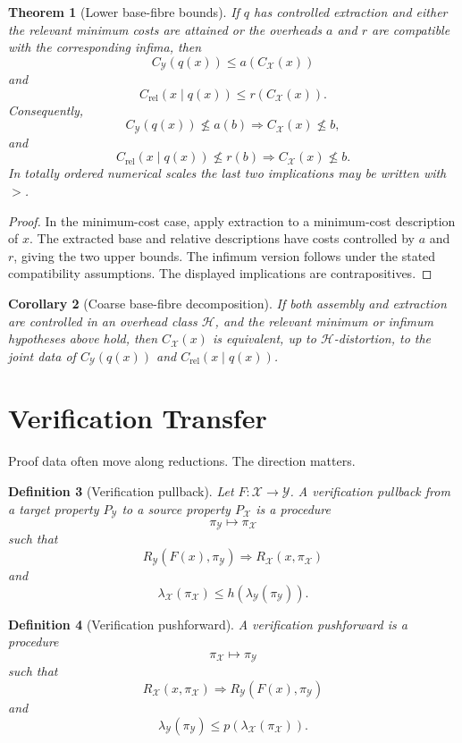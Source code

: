 \documentclass[11pt]{article}
\newtheorem{theorem}{Theorem}[section]
\newtheorem{corollary}[theorem]{Corollary}
\newtheorem{definition}[theorem]{Definition}
\begin{document}
\begin{theorem}[Lower base-fibre bounds]
If \(q\) has controlled extraction and either the relevant minimum costs are attained or the overheads \(a\) and \(r\) are compatible with the corresponding infima, then
\[
C_\mathcal Y(q(x))\leq a(C_\mathcal X(x))
\]
and
\[
C_{\mathrm{rel}}(x\mid q(x))\leq r(C_\mathcal X(x)).
\]
Consequently,
\[
C_\mathcal Y(q(x))\nleq a(b)\Longrightarrow C_\mathcal X(x)\nleq b,
\]
and
\[
C_{\mathrm{rel}}(x\mid q(x))\nleq r(b)\Longrightarrow C_\mathcal X(x)\nleq b.
\]
In totally ordered numerical scales the last two implications may be written with \(>\).
\end{theorem}

\begin{proof}
In the minimum-cost case, apply extraction to a minimum-cost description of \(x\). The extracted base and relative descriptions have costs controlled by \(a\) and \(r\), giving the two upper bounds. The infimum version follows under the stated compatibility assumptions. The displayed implications are contrapositives.
\end{proof}

\begin{corollary}[Coarse base-fibre decomposition]
If both assembly and extraction are controlled in an overhead class \(\mathcal H\), and the relevant minimum or infimum hypotheses above hold, then \(C_\mathcal X(x)\) is equivalent, up to \(\mathcal H\)-distortion, to the joint data of \(C_\mathcal Y(q(x))\) and \(C_{\mathrm{rel}}(x\mid q(x))\).
\end{corollary}

\section{Verification Transfer}

Proof data often move along reductions. The direction matters.

\begin{definition}[Verification pullback]
Let \(F:\mathcal X\to\mathcal Y\). A verification pullback from a target property \(P_\mathcal Y\) to a source property \(P_\mathcal X\) is a procedure
\[
\pi_\mathcal Y\mapsto \pi_\mathcal X
\]
such that
\[
R_\mathcal Y(F(x),\pi_\mathcal Y)
\Longrightarrow
R_\mathcal X(x,\pi_\mathcal X)
\]
and
\[
\lambda_\mathcal X(\pi_\mathcal X)
\leq
h(\lambda_\mathcal Y(\pi_\mathcal Y)).
\]
\end{definition}

\begin{definition}[Verification pushforward]
A verification pushforward is a procedure
\[
\pi_\mathcal X\mapsto \pi_\mathcal Y
\]
such that
\[
R_\mathcal X(x,\pi_\mathcal X)
\Longrightarrow
R_\mathcal Y(F(x),\pi_\mathcal Y)
\]
and
\[
\lambda_\mathcal Y(\pi_\mathcal Y)
\leq
p(\lambda_\mathcal X(\pi_\mathcal X)).
\]
\end{definition}
\end{document}
